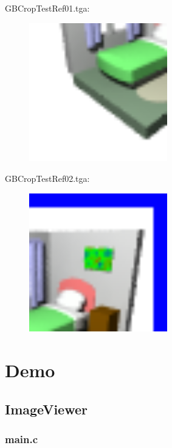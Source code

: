 GBCropTestRef01.tga:\\
\begin{center}
\begin{figure}[H]
\centering\includegraphics[width=6cm]{./GBCropTestRef01.png}\\
\end{figure}
\end{center}

GBCropTestRef02.tga:\\
\begin{center}
\begin{figure}[H]
\centering\includegraphics[width=6cm]{./GBCropTestRef02.png}\\
\end{figure}
\end{center}

\section{Demo}

\subsection{ImageViewer}

\subsubsection{main.c}

